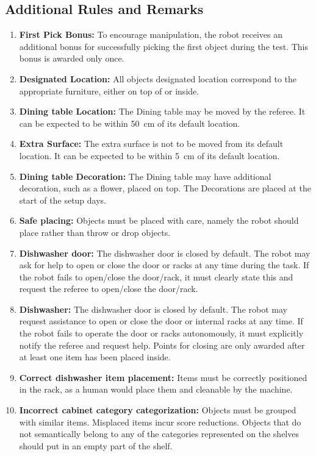 \subsection*{Additional Rules and Remarks}
\begin{enumerate}[nosep]
	\item \textbf{First Pick Bonus:} To encourage manipulation, the robot receives an additional bonus for successfully picking the first object during the test. This bonus is awarded only once.
	\item \textbf{Designated Location:} All objects designated location correspond to the appropriate furniture, either on top of or inside.
	\item \textbf{Dining table Location:} The Dining table may be moved by the referee. It can be expected to be within \SI{50}{\centi\meter} of its default location.
	\item \textbf{Extra Surface:} The extra surface is not to be moved from its default location. It can be expected to be within \SI{5}{\centi\meter} of its default location.
	\item \textbf{Dining table Decoration:} The Dining table may have additional decoration, such as a flower, placed on top. The Decorations are placed at the start of the setup days.
	\item \textbf{Safe placing:} Objects must be placed with care, namely the robot should place rather than throw or drop objects.
	\item \textbf{Dishwasher door:} The dishwasher door is closed by default.
	The robot may ask for help to open or close the door or racks at any time during the task. If the robot fails to open/close the door/rack, it must clearly state this and request the referee to open/close the door/rack.
	\item \textbf{Dishwasher:} The dishwasher door is closed by default. The robot may request assistance to open or close the door or internal racks at any time. If the robot fails to operate the door or racks autonomously, it must explicitly notify the referee and request help. Points for closing are only awarded after at least one item has been placed inside.
	\item \textbf{Correct dishwasher item placement:} Items must be correctly positioned in the rack, as a human would place them and cleanable by the machine.
	\item \textbf{Incorrect cabinet category categorization:} Objects must be grouped with similar items. Misplaced items incur score reductions. Objects that do not semantically belong to any of the categories represented on the shelves should put in an empty part of the shelf.

\end{enumerate}
